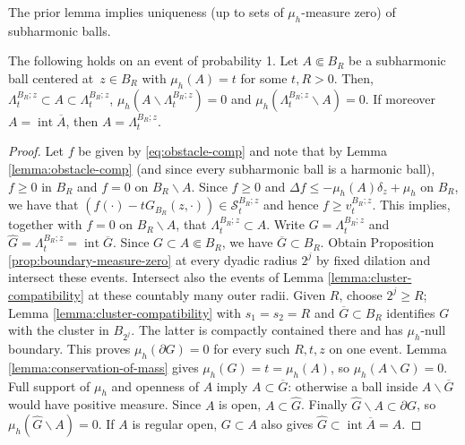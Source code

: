\documentclass[12pt]{amsart}
\numberwithin{equation}{section}
\newcommand{\mclS}[2]{\hyperref[eq:super-solutions]{\mathcal{S}^{#1}_{#2}}}
\newcommand{\cluster}[2]{\hyperref[eq:non-co-set]{\mathit{\Lambda}^{#1}_{#2}}}
\newcommand{\regcluster}[2]{\hyperref[eq:regular-cluster]{\Lambda^{#1}_{#2}}}
\newcommand{\odometer}[2]{\hyperref[eq:limit-odometer]{v^{#1}_{#2}}}
\begin{document}
	The prior lemma implies uniqueness (up to sets of $\mu_h$-measure zero) of subharmonic balls. 
	\begin{prop} \label{prop:sub-harmonic-ball-uniqueness} 
		The following holds on an event of probability 1. Let $A \Subset B_R$ be a subharmonic ball centered at~$z \in B_R$ with $\mu_h(A)=t$ for some $t, R > 0$. Then, ${\cluster{B_R;z}{t}} \subset A \subset {\regcluster{B_R;z}{t}}$, $\mu_h(A \backslash {\cluster{B_R;z}{t}}) = 0$ and $\mu_h({\regcluster{B_R;z}{t}} \backslash A) = 0$. If moreover $A = \operatorname{int}\overline A$, then $A = {\regcluster{B_R;z}{t}}$.  
	\end{prop}
	
	\begin{proof}
		Let $f$ be given by \eqref{eq:obstacle-comp} and note that by Lemma \ref{lemma:obstacle-comp} (and since every subharmonic ball is a harmonic ball), 
		$f  \geq 0$ in $B_R$ and $f = 0$ on $B_R \backslash A$.  Since $f \geq 0$ and $\Delta f \leq -\mu_h(A) \delta_z + \mu_h$ on $B_R$, we have that $(f(\cdot)- t G_{B_R}(z,\cdot)) \in \mclS{B_R; z}{t}$ and hence $f \geq \odometer{B_R; z}{t}$. This implies, together with $f = 0$ on $B_R \backslash A$, that  $\cluster{B_R; z}{t} \subset A$. 
		Write $G = \cluster{B_R; z}{t}$ and $\widehat G = \regcluster{B_R; z}{t} = \operatorname{int}\overline G$. Since $G \subset A \Subset B_R$, we have $\overline G \subset B_R$.
		Obtain Proposition \ref{prop:boundary-measure-zero} at every dyadic radius $2^j$ by fixed dilation and intersect these events. Intersect also the events of Lemma \ref{lemma:cluster-compatibility} at these countably many outer radii. Given $R$, choose $2^j \geq R$; Lemma \ref{lemma:cluster-compatibility} with $s_1 = s_2 = R$ and $\overline G \subset B_R$ identifies $G$ with the cluster in $B_{2^j}$. The latter is compactly contained there and has $\mu_h$-null boundary. This proves $\mu_h(\partial G) = 0$ for every such $R, t, z$ on one event.
		Lemma \ref{lemma:conservation-of-mass} gives $\mu_h(G) = t = \mu_h(A)$, so $\mu_h(A \backslash G) = 0$. Full support of $\mu_h$ and openness of $A$ imply $A \subset \overline G$: otherwise a ball inside $A \backslash \overline G$ would have positive measure. Since $A$ is open, $A \subset \widehat G$. Finally $\widehat G \backslash A \subset \partial G$, so $\mu_h(\widehat G \backslash A) = 0$. If $A$ is regular open, $G \subset A$ also gives $\widehat G \subset \operatorname{int}\overline A = A$. 
	\end{proof}
	
\end{document}
